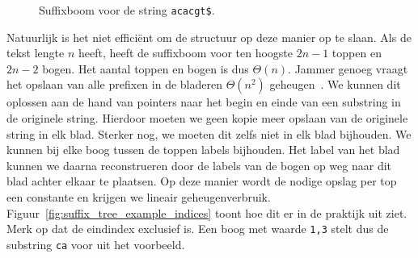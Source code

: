 \begin{figure}[H]
    \center
    \caption{Suffixboom voor de string \texttt{acacgt\$}.}\label{fig:suffix_tree_example}

\end{figure}

Natuurlijk is het niet efficiënt om de structuur op deze manier op te slaan.
Als de tekst lengte $n$ heeft, heeft de suffixboom voor ten hoogste $2n - 1$ toppen en $2n - 2$ bogen.
Het aantal toppen en bogen is dus $\Theta(n)$.
Jammer genoeg vraagt het opslaan van alle prefixen in de bladeren $\Theta(n^2)$ geheugen~\cite{AD3_ukkonen}.
We kunnen dit oplossen aan de hand van pointers naar het begin en einde van een substring in de originele string.
Hierdoor moeten we geen kopie meer opslaan van de originele string in elk blad.
Sterker nog, we moeten dit zelfs niet in elk blad bijhouden.
We kunnen bij elke boog tussen de toppen labels bijhouden.
Het label van het blad kunnen we daarna reconstrueren door de labels van de bogen op weg naar dit blad achter elkaar te plaatsen.
Op deze manier wordt de nodige opslag per top een constante en krijgen we lineair geheugenverbruik.
Figuur~\ref{fig:suffix_tree_example_indices} toont hoe dit er in de praktijk uit ziet.
Merk op dat de eindindex exclusief is.
Een boog met waarde \texttt{1,3} stelt dus de substring \texttt{ca} voor uit het voorbeeld.

